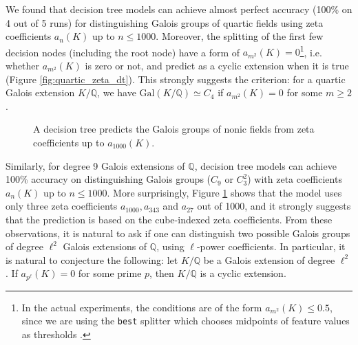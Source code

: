 \documentclass[letterpaper, 10pt]{article}
\newcommand{\Gal}{\mathrm{Gal}}
\newcommand{\bQ}{\mathbb{Q}}
\newcommand{\1}{\mathds{1}}	%
\theoremstyle{definition}
\theoremstyle{remark}
\begin{document}
We found that decision tree models can achieve  almost perfect accuracy (100\% on 4 out of 5 runs) for distinguishing Galois groups of quartic fields using zeta coefficients $a_n(K)$ up to $n \le 1000$.
Moreover, the splitting of the first few decision nodes (including the root node) have a form of $a_{m^2}(K)  = 0$\footnote{ In the actual experiments, the conditions are of the form $a_{m^2}(K) \le 0.5$, since we are using the \texttt{best} splitter which chooses midpoints of feature values as thresholds \cite{sklearn-dt2}.}, i.e. whether $a_{m^2}(K)$ is zero or not, and predict as a cyclic extension when it is true (Figure \ref{fig:quartic_zeta_dt}).
This strongly suggests the  criterion: for a quartic Galois extension $K / \bQ$, we have $\Gal(K/\bQ) \simeq C_4$  if  $a_{m^2}(K) = 0$ for some $m \ge 2$.


\begin{figure}[t]
    \centering
    \footnotesize
    \caption{A decision tree predicts the Galois groups of nonic fields from zeta coefficients up to $a_{1000}(K)$.}
    \label{fig:nonic_zeta_dt}
\end{figure}


Similarly, for degree 9 Galois extensions of $\bQ$, decision tree models can achieve 100\% accuracy on distinguishing Galois groups ($C_9$ or $C_3^2$) with zeta coefficients $a_n(K)$ up to $n \le 1000$.
More surprisingly, Figure \ref{fig:nonic_zeta_dt} shows that the model uses only three zeta coefficients $a_{1000}, a_{343}$ and $a_{27}$ out of 1000, and it strongly suggests that the prediction is based on the cube-indexed zeta coefficients.
From these observations, it is natural to ask if one can distinguish two possible Galois groups of degree $\ell^2$ Galois extensions of $\bQ$, using $\ell$-power coefficients.
 In particular, it is natural to conjecture the following: let $K / \bQ$ be a Galois extension of degree $\ell^2$. If $a_{p^\ell}(K) = 0$ for some prime $p$, then $K / \bQ$ is a cyclic extension.
\end{document}
